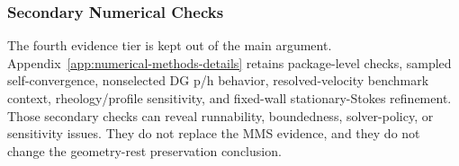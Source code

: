 \subsubsection{Secondary Numerical Checks}
\label{subsec:verification-summary}

The fourth evidence tier is kept out of the main argument.
Appendix~\ref{app:numerical-methods-details} retains package-level checks,
sampled self-convergence, nonselected DG p/h behavior, resolved-velocity
benchmark context, rheology/profile sensitivity, and fixed-wall
stationary-Stokes refinement. Those secondary checks can reveal runnability,
boundedness, solver-policy, or sensitivity issues. They do not replace the MMS
evidence, and they do not change the geometry-rest preservation conclusion.

\FloatBarrier
